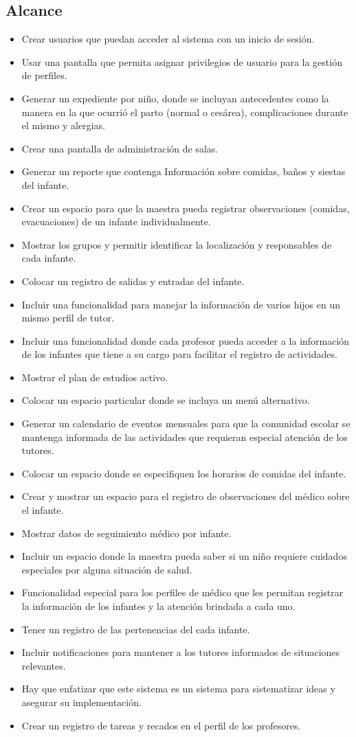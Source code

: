 \documentclass{article}
\begin{document}
\subsection{Alcance}
\begin{itemize}
	\item Crear usuarios que puedan acceder al sistema con un inicio de sesión.
	\item Usar una pantalla que permita asignar privilegios de usuario para la gestión de perfiles.
	\item Generar un expediente por niño, donde se incluyan antecedentes como la manera en la que ocurrió el parto (normal o cesárea), complicaciones durante el mismo y alergias.
	\item Crear una pantalla de administración de salas.
	\item Generar un reporte que contenga Información sobre comidas, baños y siestas del infante.
	\item Crear un espacio para que la maestra pueda registrar observaciones (comidas, evacuaciones) de un infante individualmente.
	\item Mostrar los grupos y permitir identificar la localización y responsables de cada infante.
	\item Colocar un registro de salidas y entradas del infante.
	\item Incluir una funcionalidad para manejar la información de varios hijos en un mismo perfil de tutor.
	\item Incluir una funcionalidad donde cada profesor pueda acceder a la información de los infantes que tiene a su cargo para facilitar el registro de actividades.
	\item Mostrar el plan de estudios activo.
	\item Colocar un espacio particular donde se incluya un menú alternativo.
	\item Generar un calendario de eventos mensuales para que la comunidad escolar se mantenga informada de las actividades que requieran especial atención de los tutores.
	\item Colocar un espacio donde se especifiquen los horarios de comidas del infante.
	\item Crear y mostrar un espacio para el registro de observaciones del médico sobre el infante.
	\item Mostrar datos de seguimiento médico por infante.
	\item Incluir un espacio donde la maestra pueda saber si un niño requiere cuidados especiales por alguna situación de salud.
	\item Funcionalidad especial para los perfiles de médico que les permitan registrar la información de los infantes y la atención brindada a cada uno.
	\item Tener un registro de las pertenencias del cada infante.
	\item Incluir notificaciones para mantener a los tutores informados de situaciones relevantes.
	\item Hay que enfatizar que este sistema es un sistema para sistematizar ideas y asegurar su implementación.
	\item Crear un registro de tareas y recados en el perfil de los profesores.

\end{itemize}
\end{document}
